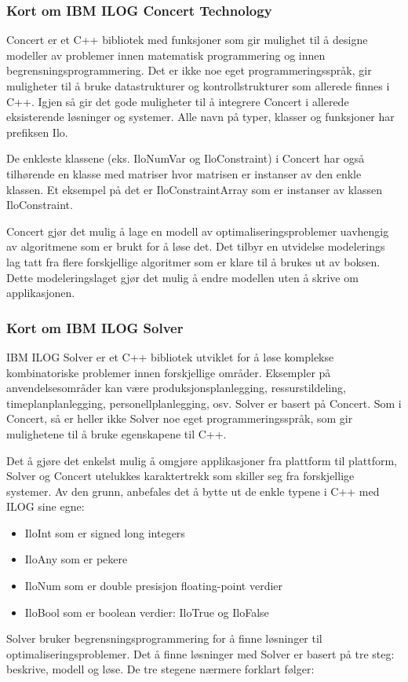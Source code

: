 \subsubsection{Kort om IBM ILOG Concert Technology}
Concert er et C++ bibliotek med funksjoner som gir mulighet til å designe modeller av problemer innen matematisk programmering og innen begrensningsprogrammering. Det er ikke noe eget programmeringsspråk, gir muligheter til å bruke datastrukturer og kontrollstrukturer som allerede finnes i C++. Igjen så gir det gode muligheter til å integrere Concert i allerede eksisterende løsninger og systemer. Alle navn på typer, klasser og funksjoner har prefiksen Ilo.

De enkleste klassene (eks. IloNumVar og IloConstraint) i Concert har også tilhørende en klasse med matriser hvor matrisen er instanser av den enkle klassen. Et eksempel på det er IloConstraintArray som er instanser av klassen IloConstraint.\cite{cpconcertilog}

Concert gjør det mulig å lage en modell av optimaliseringsproblemer uavhengig av algoritmene som er brukt for å løse det. Det tilbyr en utvidelse modelerings lag tatt fra flere forskjellige algoritmer som er klare til å brukes ut av boksen. Dette modeleringslaget gjør det mulig å endre modellen uten å skrive om applikasjonen.\cite{cpsolverilog}

\subsubsection{Kort om IBM ILOG Solver}
IBM ILOG Solver er et C++ bibliotek utviklet for å løse komplekse kombinatoriske problemer innen forskjellige områder. Eksempler på anvendelsesområder kan være produksjonsplanlegging, ressurstildeling, timeplanplanlegging, personellplanlegging, osv. Solver er basert på Concert. Som i Concert, så er heller ikke Solver noe eget programmeringsspråk, som gir mulighetene til å bruke egenskapene til C++.

Det å gjøre det enkelst mulig å omgjøre applikasjoner fra plattform til plattform, Solver og Concert utelukkes karaktertrekk som skiller seg fra forskjellige systemer. Av den grunn, anbefales det å bytte ut de enkle typene i C++ med ILOG sine egne:
\begin{itemize}
\item IloInt som er signed long integers
\item IloAny som er pekere
\item IloNum som er double presisjon floating-point verdier
\item IloBool som er boolean verdier: IloTrue og IloFalse
\end{itemize}
Solver bruker begrensningsprogrammering for å finne løsninger til optimaliseringsproblemer. Det å finne løsninger med Solver er basert på tre steg: beskrive, modell og løse. De tre stegene nærmere forklart følger:

